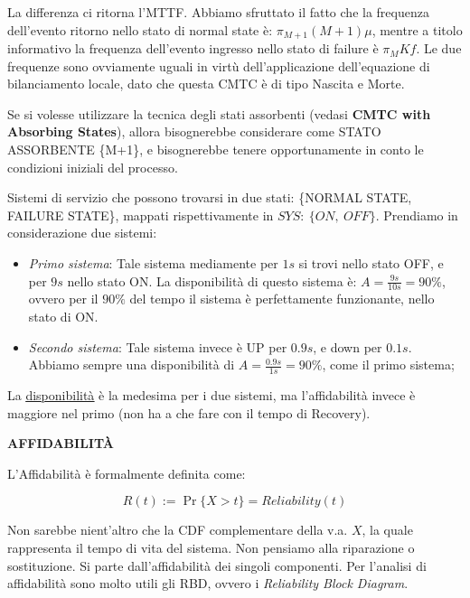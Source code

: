 La differenza ci ritorna l'MTTF. Abbiamo sfruttato il fatto che la frequenza dell'evento ritorno nello stato di normal state è: $\pi_{M+1}(M+1)\mu$, mentre a titolo informativo la frequenza dell'evento ingresso nello stato di failure è $\pi_MKf$. Le due frequenze sono ovviamente uguali in virtù dell'applicazione dell'equazione di bilanciamento locale, dato che questa CMTC è di tipo Nascita e Morte.

Se si volesse utilizzare la tecnica degli stati assorbenti (vedasi \textbf{CMTC with Absorbing States}), allora bisognerebbe considerare come STATO ASSORBENTE \{M+1\}, e bisognerebbe tenere opportunamente in conto le condizioni iniziali del processo.

Sistemi di servizio che possono trovarsi in due stati: \{NORMAL STATE, FAILURE STATE\}, mappati rispettivamente in $SYS:\ \{ON,\ OFF\}$. Prendiamo in considerazione due sistemi:

\begin{itemize}

\item{\textit{Primo sistema}}: \newline
Tale sistema mediamente per $1s$ si trovi nello stato OFF, e per $9s$ nello stato ON. La disponibilità di questo sistema è: $A = \frac{9s}{10s} = 90\%$, ovvero per il $90\%$ del tempo il sistema è perfettamente funzionante, nello stato di ON.

\item{\textit{Secondo sistema}}: \newline
Tale sistema invece è UP per $0.9s$, e down per $0.1s$. Abbiamo sempre una disponibilità di $A = \frac{0.9s}{1s} = 90\%$, come il primo sistema;

\end{itemize}

La \underline{\underline{disponibilità}} è la medesima per i due sistemi, ma l'affidabilità invece è maggiore nel primo (non ha a che fare con il tempo di Recovery).


\begin{defn}{\textbf{AFFIDABILIT\`A}}

L'Affidabilità è formalmente definita come:

\[
	R(t) := \Pr\{X > t\} = Reliability(t)
\]
\end{defn}

Non sarebbe nient'altro che la CDF complementare della v.a. $X$, la quale rappresenta il tempo di vita del sistema. Non pensiamo alla riparazione o sostituzione. Si parte dall'affidabilità dei singoli componenti. Per l'analisi di affidabilità sono molto utili gli RBD, ovvero i \textit{Reliability Block Diagram}.

